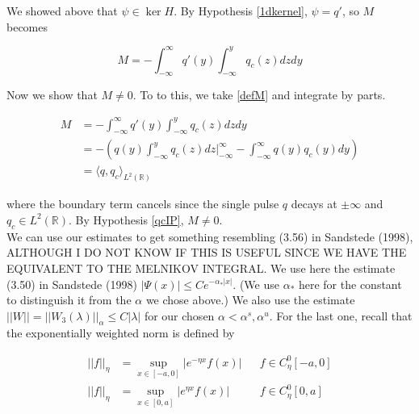 \documentclass[12pt]{article}
\def\R{{\mathbb R}}
\begin{document}
We showed above that $\psi \in \ker H$. By Hypothesis \ref{1dkernel}, $\psi = q'$, so $M$ becomes

\begin{equation}\label{defM}
M = -\int_{-\infty}^\infty q'(y) \int_{-\infty}^y q_c(z) dz dy
\end{equation}

Now we show that $M \neq 0$. To to this, we take \eqref{defM} and integrate by parts.

\begin{align*}
M &= -\int_{-\infty}^\infty q'(y) \int_{-\infty}^y q_c(z) dz dy \\
&= -\left( q(y) \int_{-\infty}^y q_c(z) dz \Big|_{-\infty}^{\infty} - \int_{-\infty}^\infty q(y) q_c(y) dy \right)\\
&= \langle q, q_c \rangle_{L^2(\R)}
\end{align*}

where the boundary term cancels since the single pulse $q$ decays at $\pm \infty$ and $q_c \in L^2(\R)$. By Hypothesis \ref{qcIP}, $M \neq 0$.\\

We can use our estimates to get something resembling (3.56) in Sandstede (1998), ALTHOUGH I DO NOT KNOW IF THIS IS USEFUL SINCE WE HAVE THE EQUIVALENT TO THE MELNIKOV INTEGRAL. We use here the estimate (3.50) in Sandstede (1998) $|\Psi(x)| \leq C e^{-\alpha_* |x|}$. (We use $\alpha_*$ here for the constant to distinguish it from the $\alpha$ we chose above.) We also use the estimate $||W|| = ||W_3(\lambda)||_\alpha \leq C|\lambda|$ for our chosen $\alpha < \alpha^s, \alpha^u$. For the last one, recall that the exponentially weighted norm is defined by

\begin{align*}
|| f ||_\eta &= \sup_{x \in [-a, 0]} |e^{-\eta x} f(x) | && f \in C^0_\eta[-a, 0] \\
|| f ||_\eta &= \sup_{x \in [0, a]} |e^{\eta x} f(x) | && f \in C^0_\eta[0, a] \\
\end{align*}
\end{document}
